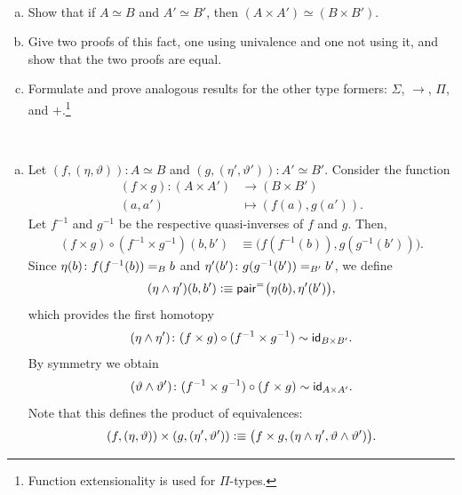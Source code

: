 \begin{exr}${}$\fe\ \ua
    \begin{enumerate}[a),font=\upshape]
        \item Show that if\/ $A\simeq B$ and\/ $A'\simeq B'$, then\/ $(A\times A')\simeq(B\times B')$.
        \item Give two proofs of this fact, one using univalence and one not using it, and show that the two proofs are equal.
        \item Formulate and prove analogous results for the other type formers:\/ $\Sigma$, $\to$, $\Pi$, and\/ $+$.\footnote{Function extensionality is used for $\Pi$-types.}
    \end{enumerate}
\end{exr}

\begin{solution}${}$
    \begin{enumerate}[a),font=\upshape]
        \item Let $(f,(\eta,\vartheta))\colon A\simeq B$ and $(g,(\eta',\vartheta'))\colon A'\simeq B'$. Consider the function
        \begin{align*}
            (f\times g)\colon(A\times A')&\to(B\times B')\\
            (a,a')&\mapsto(f(a),g(a')).
        \end{align*}
        Let $f^{-1}$ and $g^{-1}$ be the respective quasi-inverses of $f$ and $g$. Then,
        \begin{align*}
            (f\times g)\circ(f^{-1}\times g^{-1})(b,b')
            &\equiv
            \bigl(
                f(f^{-1}(b)),g(g^{-1}(b'))
            \bigr).
        \end{align*}
        Since $\eta(b)\colon f(f^{-1}(b))\eq{B}b$ and $\eta'(b')\colon g(g^{-1}(b'))\eq{B'}b'$, we define
        \[
            (\eta\wedge\eta')(b,b')
                \mathrel{\vcentcolon}\equiv\mathsf{pair}^{\mathrel{=_{}}}\bigl(\eta(b),\eta'(b')\bigr),
        \]
        which provides the first homotopy
        \[
            (\eta\wedge\eta')\colon(f\times g)\circ(f^{-1}\times g^{-1})
                \sim\id_{B\times B'}.
        \]
        By symmetry we obtain
        \[
            (\vartheta\wedge\vartheta')\colon
                (f^{-1}\times g^{-1})\circ(f\times g)
                \sim\id_{A\times A'}.
        \]
        Note that this defines the product of equivalences:
        \begin{equation}\label{eq:eqv-product}
            (f,(\eta,\vartheta))\times(g,(\eta',\vartheta'))
                \mathrel{\vcentcolon}\equiv
                    \bigl(
                        f\times g,
                        (
                            \eta\wedge\eta',
                            \vartheta\wedge\vartheta'
                        )
                    \bigr).
        \end{equation}


\end{enumerate}
\end{solution}

